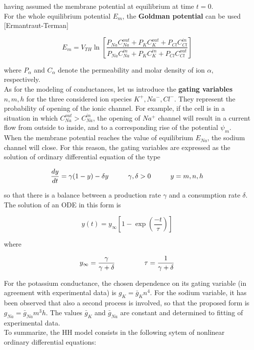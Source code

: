 \documentclass[12pt, a4paper]{article}
\begin{document}
having assumed the membrane potential at equilibrium at time $t=0$.\\
For the whole equilibrium potential $E_m$, the \textbf{Goldman potential} can be used [Ermantraut-Terman]


\begin{equation}
E_m= V_{TH} \ln \left[\frac{P_{Na} C_{Na}^{out} + P_{K} C_K^{out} + P_{Cl} C_{Cl}^{in}}{P_{Na} C_{Na}^{in} + P_{K} C_K^{in} + P_{Cl} C_{Cl}^{out}}\right]
\end{equation}

where $P_\alpha$ and $C_\alpha$  denote the permeability and molar density of ion $\alpha$, respectively.\\
As for the modeling of conductances, let us introduce the \textbf{gating variables} $n,m,h$ for the three considered ion species $K^+,Na^-,Cl^-$. They represent the probability of opening of the ionic channel. For example, if the cell is in a situation in which $C_{Na}^{out} > C_{Na}^{in}$, the opening of $Na^+$ channel will result in a current flow from outside to inside, and to a corresponding rise of the potential $\psi_m$. When the membrane potential reaches the value of equilibrium $E_{Na}$, the sodium channel will close. For this reason, the gating variables are expressed as the solution of ordinary differential equation of the type

\begin{equation}
\frac{dy}{dt} = \gamma (1-y) - \delta y \hspace{1 cm} \gamma,\delta >0  \hspace{1 cm} y = m,n,h
\end{equation}

so that there is a balance between a production rate $\gamma$ and a consumption rate $\delta$. The solution of an ODE in this form is

\begin{equation}
y(t) = y_\infty \left[1 - \exp\left(\frac{-t}{\tau}\right)\right]
\end{equation}

where

\begin{equation}
y_\infty = \frac{\gamma}{\gamma + \delta} \hspace{1.5cm} \tau = \frac{1}{\gamma + \delta}
\end{equation}

For the potassium conductance, the chosen dependence on its gating variable (in agreement with experimental data) is $ g_K = \bar{g}_K n^4$. For the sodium variable, it has been observed that also a second process is involved, so that the proposed form is  $ g_{Na} = \bar{g}_{Na} m^3h$. The values $\bar{g}_K$ and $\bar{g}_{Na}$ are constant and determined to fitting of experimental data.\\
To summarize, the HH model consists in the following sytem of nonlinear ordinary differential equations:
\end{document}
